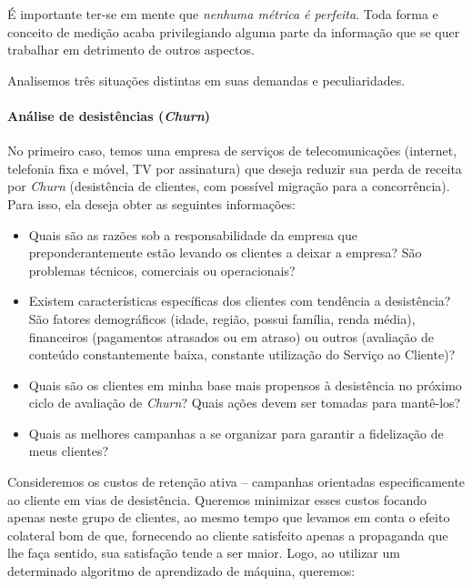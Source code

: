 \documentclass[]{article}
\let\oldparagraph\paragraph
\renewcommand{\paragraph}[1]{\oldparagraph{#1}\mbox{}}
\begin{document}
É importante ter-se em mente que \emph{nenhuma métrica é perfeita}. Toda
forma e conceito de medição acaba privilegiando alguma parte da
informação que se quer trabalhar em detrimento de outros aspectos.

Analisemos três situações distintas em suas demandas e peculiaridades.

\hypertarget{header-n401}{%
\paragraph{\texorpdfstring{Análise de desistências
(\emph{Churn})}{Análise de desistências (Churn)}}\label{header-n401}}

No primeiro caso, temos uma empresa de serviços de telecomunicações
(internet, telefonia fixa e móvel, TV por assinatura) que deseja reduzir
sua perda de receita por \emph{Churn} (desistência de clientes, com
possível migração para a concorrência). Para isso, ela deseja obter as
seguintes informações:

\begin{itemize}
\item
  Quais são as razões sob a responsabilidade da empresa que
  preponderantemente estão levando os clientes a deixar a empresa? São
  problemas técnicos, comerciais ou operacionais?
\item
  Existem características específicas dos clientes com tendência a
  desistência? São fatores demográficos (idade, região, possui família,
  renda média), financeiros (pagamentos atrasados ou em atraso) ou
  outros (avaliação de conteúdo constantemente baixa, constante
  utilização do Serviço ao Cliente)?
\item
  Quais são os clientes em minha base mais propensos à desistência no
  próximo ciclo de avaliação de \emph{Churn}? Quais ações devem ser
  tomadas para mantê-los?
\item
  Quais as melhores campanhas a se organizar para garantir a fidelização
  de meus clientes?
\end{itemize}

Consideremos os custos de retenção ativa -- campanhas orientadas
especificamente ao cliente em vias de desistência. Queremos minimizar
esses custos focando apenas neste grupo de clientes, ao mesmo tempo que
levamos em conta o efeito colateral bom de que, fornecendo ao cliente
satisfeito apenas a propaganda que lhe faça sentido, sua satisfação
tende a ser maior. Logo, ao utilizar um determinado algoritmo de
aprendizado de máquina, queremos:
\end{document}
